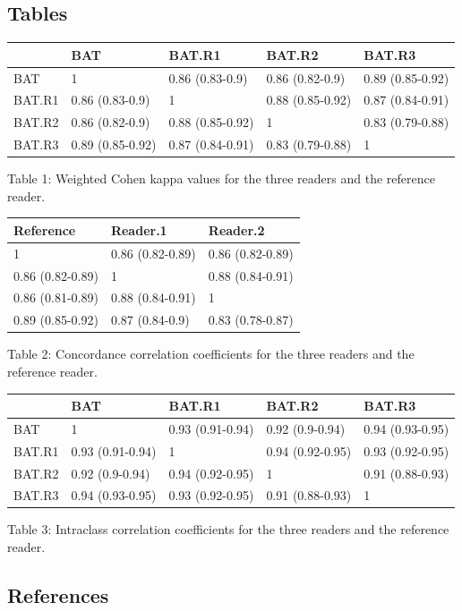 \documentclass[]{elsarticle} %
\begin{document}
\pagebreak

\subsection{Tables}\label{tables}

\begin{longtable}[]{@{}lllll@{}}
\toprule
& BAT & BAT.R1 & BAT.R2 & BAT.R3\tabularnewline
\midrule
\endhead
BAT & 1 & 0.86 (0.83-0.9) & 0.86 (0.82-0.9) & 0.89
(0.85-0.92)\tabularnewline
BAT.R1 & 0.86 (0.83-0.9) & 1 & 0.88 (0.85-0.92) & 0.87
(0.84-0.91)\tabularnewline
BAT.R2 & 0.86 (0.82-0.9) & 0.88 (0.85-0.92) & 1 & 0.83
(0.79-0.88)\tabularnewline
BAT.R3 & 0.89 (0.85-0.92) & 0.87 (0.84-0.91) & 0.83 (0.79-0.88) &
1\tabularnewline
\bottomrule
\end{longtable}

Table 1: Weighted Cohen kappa values for the three readers and the
reference reader.

\begin{longtable}[]{@{}lll@{}}
\toprule
Reference & Reader.1 & Reader.2\tabularnewline
\midrule
\endhead
1 & 0.86 (0.82-0.89) & 0.86 (0.82-0.89)\tabularnewline
0.86 (0.82-0.89) & 1 & 0.88 (0.84-0.91)\tabularnewline
0.86 (0.81-0.89) & 0.88 (0.84-0.91) & 1\tabularnewline
0.89 (0.85-0.92) & 0.87 (0.84-0.9) & 0.83 (0.78-0.87)\tabularnewline
\bottomrule
\end{longtable}

Table 2: Concordance correlation coefficients for the three readers and
the reference reader.

\begin{longtable}[]{@{}lllll@{}}
\toprule
& BAT & BAT.R1 & BAT.R2 & BAT.R3\tabularnewline
\midrule
\endhead
BAT & 1 & 0.93 (0.91-0.94) & 0.92 (0.9-0.94) & 0.94
(0.93-0.95)\tabularnewline
BAT.R1 & 0.93 (0.91-0.94) & 1 & 0.94 (0.92-0.95) & 0.93
(0.92-0.95)\tabularnewline
BAT.R2 & 0.92 (0.9-0.94) & 0.94 (0.92-0.95) & 1 & 0.91
(0.88-0.93)\tabularnewline
BAT.R3 & 0.94 (0.93-0.95) & 0.93 (0.92-0.95) & 0.91 (0.88-0.93) &
1\tabularnewline
\bottomrule
\end{longtable}

Table 3: Intraclass correlation coefficients for the three readers and
the reference reader.

\pagebreak

\subsection*{References}\label{references}
\end{document}
